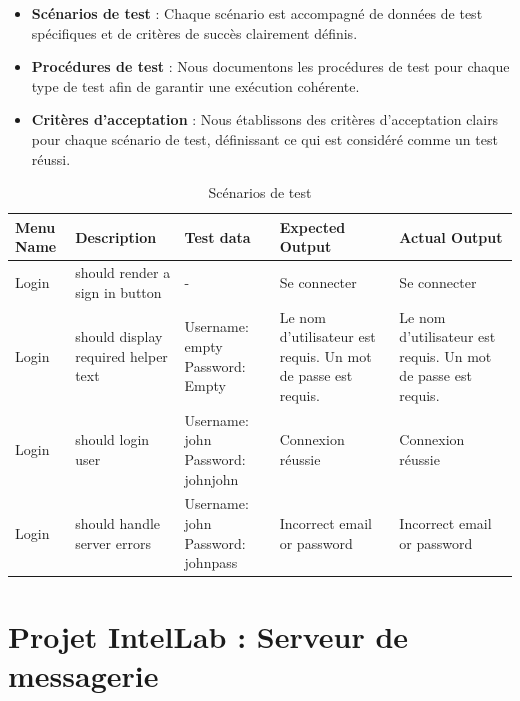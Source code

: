 \begin{itemize}
	\item \textbf{Scénarios de test} : Chaque scénario est accompagné de données de test spécifiques et de critères de succès clairement définis.
	\item \textbf{Procédures de test} : Nous documentons les procédures de test pour chaque type de test afin de garantir une exécution cohérente.
	\item \textbf{Critères d'acceptation} : Nous établissons des critères d'acceptation clairs pour chaque scénario de test, définissant ce qui est considéré comme un test réussi.
\end{itemize}

\begin{table}[H]
	\centering
	\begin{tabular}{|p{1.1cm}|p{3cm}|p{3cm}|p{4cm}|p{3cm}|}
		\hline
		\textbf{Menu Name} & \textbf{Description}                & \textbf{Test data}                & \textbf{Expected Output}                                     & \textbf{Actual Output}                                       \\ \hline
		Login              & should render a sign in button      & -                                 & Se connecter                                                 & Se connecter                                                 \\ \hline
		Login              & should display required helper text & Username: empty Password: Empty   & Le nom d'utilisateur est requis. Un mot de passe est requis. & Le nom d'utilisateur est requis. Un mot de passe est requis. \\ \hline
		Login              & should login user                   & Username: john Password: johnjohn & Connexion réussie                                            & Connexion réussie                                            \\ \hline
		Login              & should handle server errors         & Username: john Password: johnpass & Incorrect email or password                                  & Incorrect email or password                                  \\ \hline
	\end{tabular}
	\caption{Scénarios de test}
	\label{tab:test_scenarios}
\end{table}


\section{Projet IntelLab : Serveur de messagerie}

